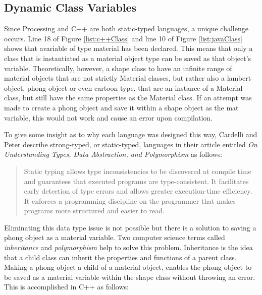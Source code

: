 \subsection{Dynamic Class Variables}
Since Processing and C++ are both static-typed languages, a unique challenge occurs.  Line 18 of Figure \ref{list:c++Class} and line 10 of Figure \ref{list:javaClass} shows that avariable of type material has been declared.  This means that only a class that is instantiated as a material object type can be saved as that object's variable.  Theoretically, however, a shape class to have an infinite range of material objects that are not strictly Material classes, but rather also a lambert object, phong object or even cartoon type, that are an instance of a Material class, but still have the same properties as the Material class.  If an attempt was made to create a phong object and save it within a shape object as the mat variable, this would not work and cause an error upon compilation.

To give some insight as to why each language was designed this way, Cardelli and Peter describe strong-typed, or static-typed, languages in their article entitled \textit{On Understanding Types, Data Abstraction, and Polymorphism} as follows:
\begin{quote}
Static typing allows type inconsistencies to be discovered at compile time and guarantees that executed programs are type-consistent. It facilitates early detection of type errors and allows greater execution-time efficiency. It enforces a programming discipline on the programmer that makes programs more structured and easier to read. \cite{cardelli1985understanding}
\end{quote}

Eliminating this data type issue is not possible but there is a solution to saving a phong object as a material variable. Two computer science terms called \textit{inheritance} and \textit{polymorphism} help to solve this problem.  Inheritance is the idea that a child class can inherit the properties and functions of a parent class.  Making a phong object a child of a material object, enables the phong object to be saved as a material variable within the shape class without throwing an error. This is accomplished in C++ as follows:

